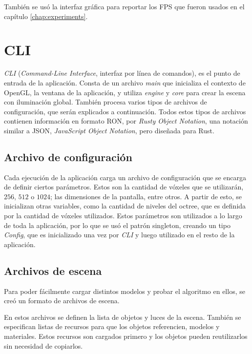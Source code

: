También se usó la interfaz gráfica para reportar los FPS que fueron usados en el capítulo \ref{chap:experiments}.

\section{CLI}

\textit{CLI} (\textit{Command-Line Interface}, interfaz por línea de comandos), es el punto de entrada de la aplicación.
Consta de un archivo \textit{main} que inicializa el contexto de OpenGL, la ventana de la aplicación, y utiliza \textit{engine} y \textit{core} para crear la escena con iluminación global.
También procesa varios tipos de archivos de configuración, que serán explicados a continuación.
Todos estos tipos de archivos contienen información en formato RON, por \textit{Rusty Object Notation}, una notación similar a JSON, \textit{JavaScript Object Notation}, pero diseñada para Rust.

\subsection{Archivo de configuración}

Cada ejecución de la aplicación carga un archivo de configuración que se encarga de definir ciertos parámetros.
Estos son la cantidad de vóxeles que se utilizarán, $256$, $512$ o $1024$; las dimensiones de la pantalla, entre otros.
A partir de esto, se inicializan otras variables, como la cantidad de niveles del octree, que es definida por la cantidad de vóxeles utilizados.
Estos parámetros son utilizados a lo largo de toda la aplicación, por lo que se usó el patrón singleton, creando un tipo \textit{Config}, que es inicializado una vez por \textit{CLI} y luego utilizado en el resto de la aplicación.

\subsection{Archivos de escena}

Para poder fácilmente cargar distintos modelos y probar el algoritmo en ellos, se creó un formato de archivos de escena.

En estos archivos se definen la lista de objetos y luces de la escena.
También se especifican listas de recursos para que los objetos referencien, modelos y materiales.
Estos recursos son cargados primero y los objetos pueden reutilizarlos sin necesidad de copiarlos.

